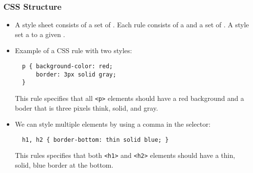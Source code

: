 \documentclass[dvipsnames]{beamer}
\begin{document}
\begin{frame}[fragile=singleslide]
  \frametitle{CSS Structure}
  
  \begin{itemize}
  \item A style sheet consists of a set of .  Each rule
    consists of a  and a set of . A
    style set a  to a given .

  \item Example of a CSS rule with two styles:
    \begin{small}
\begin{verbatim}
  p { background-color: red;
      border: 3px solid gray;
  }
\end{verbatim}
        This rule specifies that all \texttt{<p>} elements should have
        a red background and a boder that is three pixels think,
        solid, and gray. 
      \end{small}

    \item We can style multiple elements by using a comma in the selector:
      \begin{small}
\begin{verbatim}
  h1, h2 { border-bottom: thin solid blue; }
\end{verbatim}
        This rules specifies that both \texttt{<h1>} and \texttt{<h2>}
        elements should have a thin, solid, blue border at the bottom.
      \end{small}
  \end{itemize}

\end{frame}
\end{document}
